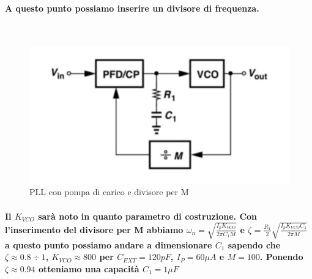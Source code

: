 \documentclass[a4paper]{article}
\begin{document}
\paragraph{A questo punto possiamo inserire un divisore di frequenza.}
~\begin{figure}[H]%
\includegraphics[scale=0.6]{DivM.png} 
\caption{PLL con pompa di carico e divisore per M}
\label{fig:foo}
\end{figure}
\paragraph{Il $K_{VCO}$ sarà noto in quanto parametro di costruzione.
Con l'inserimento del divisore per M abbiamo $\omega _n=\sqrt{\frac{I_p K_{VCO}}{2 \pi C_1M} }$ e $\zeta=\frac{R_1}{2}\sqrt{\frac{I_p K_{VCO}C_1}{2\pi M}}$ a questo punto possiamo andare a dimensionare $C_1$ sapendo che\\ $\zeta \approx0.8 \div 1$, $K_{VCO}\approx800$ per $C_{EXT}=120pF$, $I_P=60\mu A$ e $M=100$.
Ponendo $\zeta \approx0.94$ otteniamo una capacità $C_1=1\mu F$  }
 
\end{document}
